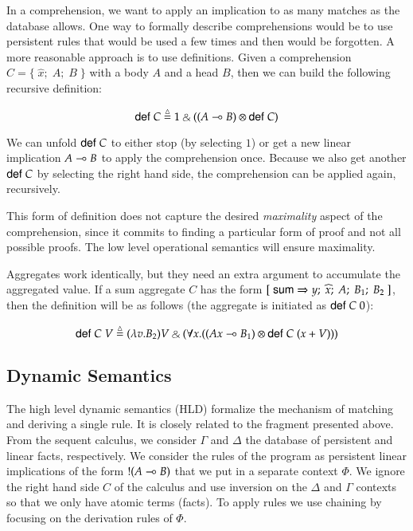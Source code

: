 In a comprehension, we want to apply an implication to as many matches as the database allows. One way to formally describe comprehensions would be to use persistent
rules that would be used a few times and then would be forgotten. A more reasonable approach is to use
definitions. Given a comprehension $C = \{ \; \widehat{x}; \; A; \; B \; \}$ with a body $A$ and a head $B$, then we can build the following recursive definition:

\[
\compr{C} \defeq 1 \with ((A \lolli B) \otimes \compr{C})
\]

We can unfold $\mathsf{def} \; C$ to either stop (by selecting $1$) or get a new linear implication $A \multimap B$
to apply the comprehension once. Because we also get another $\mathsf{def} \; C$ by selecting the right hand side,
the comprehension can be applied again, recursively.

This form of definition does not capture the desired \emph{maximality} aspect of the comprehension,
since it commits to finding a particular form of proof and not all possible proofs. The low level
operational semantics will ensure maximality.

Aggregates work identically, but they need an extra argument to accumulate the aggregated value. If a sum aggregate $C$ has the form $[\;\mathsf{sum} \Rightarrow y; \; \widehat{x}; \; A; \; B_1; \; B_2 \;]$, then the definition will be as follows (the aggregate is initiated as $\mathsf{def} \; C \; 0$):

\[
\compr{C} \; V \defeq (\lambda v. B_2)V \with (\forall x. ((Ax \lolli B_1) \otimes \compr{C} \; (x + V)))
\]

\subsection{Dynamic Semantics}

The high level dynamic semantics (HLD) formalize the mechanism of matching and deriving a single rule. It is closely related to the fragment presented above.
From the sequent calculus, we consider $\Gamma$ and $\Delta$ the database of persistent and linear facts, respectively.
We consider the rules of the program as persistent linear implications of the form ${!} (A \multimap B)$ that we put in a separate context $\Phi$.
We ignore the right hand side $C$ of the calculus and use inversion on the $\Delta$ and $\Gamma$ contexts so that we only have atomic terms (facts). To apply rules
we use chaining by focusing on the derivation rules of $\Phi$.

